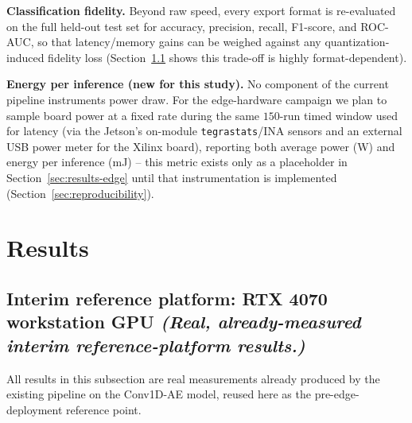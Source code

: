 \documentclass[11pt,a4paper]{article}
\newcommand{\realnote}{{\footnotesize\color{blue!50!black}\textit{(Real, already-measured interim reference-platform results.)}}}
\begin{document}
\textbf{Classification fidelity.} Beyond raw speed, every export format is re-evaluated
on the full held-out test set for accuracy, precision, recall, F1-score, and ROC-AUC,
so that latency/memory gains can be weighed against any quantization-induced fidelity
loss (Section~\ref{sec:results-rtx} shows this trade-off is highly format-dependent).

\textbf{Energy per inference (new for this study).} No component of the current
pipeline instruments power draw. For the edge-hardware campaign we plan to sample board
power at a fixed rate during the same $150$-run timed window used for latency (via the
Jetson's on-module \texttt{tegrastats}/INA sensors and an external USB power meter for
the Xilinx board), reporting both average power (W) and energy per inference (mJ) --
this metric exists only as a placeholder in Section~\ref{sec:results-edge} until that
instrumentation is implemented (Section~\ref{sec:reproducibility}).

\section{Results}
\label{sec:results}

\subsection{Interim reference platform: RTX 4070 workstation GPU \realnote}
\label{sec:results-rtx}

All results in this subsection are real measurements already produced by the existing
pipeline on the Conv1D-AE model, reused here as the pre-edge-deployment reference point.
\end{document}
